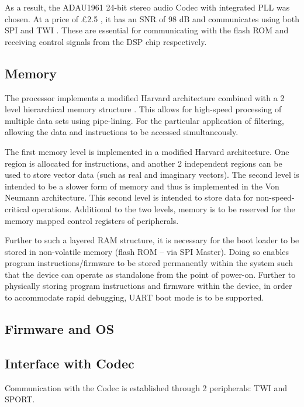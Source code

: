 As a result, the ADAU1961 24-bit stereo audio Codec with integrated PLL was chosen. At a price of £2.5 \autocite{digikeyCodec}, it has an SNR of 98 dB and communicates using both SPI and TWI \autocite{codec_datasheet}. These are essential for communicating with the flash ROM and receiving control signals from the DSP chip respectively.



\subsection{Memory}
The processor implements a modified Harvard architecture combined with a 2 level hierarchical memory structure \autocite{blackfinDSP}. This allows for high-speed processing of multiple data sets using pipe-lining. For the particular application of filtering, allowing the data and instructions to be accessed simultaneously.

The first memory level is implemented in a modified Harvard architecture. One region is allocated for instructions, and another 2 independent regions can be used to store vector data (such as real and imaginary vectors). The second level is intended to be a slower form of memory and thus is implemented in the Von Neumann architecture. This second level is intended to store data for non-speed-critical operations. Additional to the two levels, memory is to be reserved for the memory mapped control registers of peripherals. 

Further to such a layered RAM structure, it is necessary for the boot loader to be stored in non-volatile memory (flash ROM – via SPI Master). Doing so enables program instructions/firmware to be stored permanently within the system such that the device can operate as standalone from the point of power-on. Further to physically storing program instructions and firmware within the device, in order to accommodate rapid debugging, UART boot mode is to be supported.

\subsection{Firmware and OS}



\subsection{Interface with Codec}
Communication with the Codec is established through 2 peripherals: TWI and SPORT.

